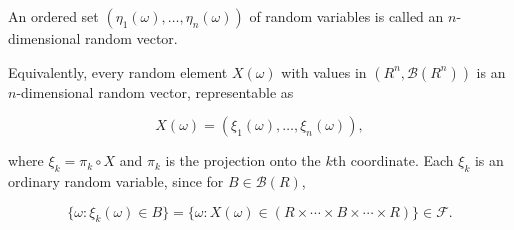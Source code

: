An ordered set $(\eta_1(\omega), \ldots, \eta_n(\omega))$ of random variables is called an $n$-dimensional random vector.

Equivalently, every random element $X(\omega)$ with values in $(R^n, \mathcal{B}(R^n))$ is an $n$-dimensional random vector, representable as

$$X(\omega) = (\xi_1(\omega), \ldots, \xi_n(\omega)),$$

where $\xi_k = \pi_k \circ X$ and $\pi_k$ is the projection onto the $k$th coordinate. Each $\xi_k$ is an ordinary random variable, since for $B \in \mathcal{B}(R)$,

$$\{\omega : \xi_k(\omega) \in B\} = \{\omega : X(\omega) \in (R \times \cdots \times B \times \cdots \times R)\} \in \mathcal{F}.$$
